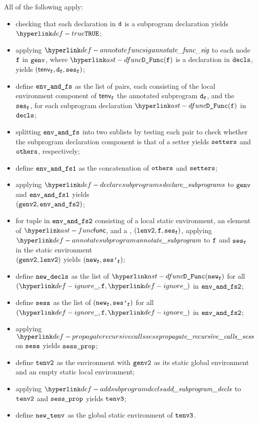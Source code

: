 \ProseParagraph
All of the following apply:
\begin{itemize}
  \item checking that each declaration in $\texttt{d}$ is a subprogram declaration yields $\True$\ProseTerminateAs{\BadDeclaration};
  \item applying $\annotatefuncsig$ to each node $\texttt{f}$ in $\texttt{genv}$, where $\DFunc(\vf)$ is a declaration in $\texttt{decls}$,
        yields $(\textsf{tenv}_{\texttt{f}}, \texttt{d}_{\texttt{f}}, \texttt{ses}_{\texttt{f}})$\ProseOrTypeError;
  \item define $\texttt{env\_and\_fs}$ as the list of pairs, each consisting of the local environment component of $\textsf{tenv}_{\texttt{f}}$
        the annotated subprogram $\texttt{d}_{\texttt{f}}$, and the \sideeffectsetterm\ $\texttt{ses}_{\texttt{f}}$, for each subprogram declaration $\DFunc(\vf)$ in $\texttt{decls}$;
  \item splitting $\texttt{env\_and\_fs}$ into two sublists by testing each pair to check whether the subprogram declaration
        component is that of a setter yields $\texttt{setters}$ and $\texttt{others}$, respectively;
  \item define $\texttt{env\_and\_fs1}$ as the concatenation of $\texttt{others}$ and $\texttt{setters}$;
  \item applying $\declaresubprograms$ to $\texttt{genv}$ and $\texttt{env\_and\_fs1}$ yields \\
        $(\texttt{genv2}, \texttt{env\_and\_fs2})$\ProseOrTypeError;
  \item for tuple in $\texttt{env\_and\_fs2}$ consisting of a local static environment, an element of $\func$,
        and a \sideeffectsetterm, $(\texttt{lenv2}, \texttt{f}, \texttt{ses}_{\texttt{f}})$,
        applying $\annotatesubprogram$ to $\texttt{f}$ and $\texttt{ses}_{\texttt{f}}$ in the static environment \\
        $(\texttt{genv2}, \texttt{lenv2})$ yields $(\texttt{new}_{\texttt{f}}, \texttt{ses'}_{\texttt{f}})$\ProseOrTypeError;
  \item define $\texttt{new\_decls}$ as the list of $\DFunc(\vnew_\vf)$ for all $(\Ignore, \vf, \Ignore)$ in $\texttt{env\_and\_fs2}$;
  \item define $\texttt{sess}$ as the list of $(\texttt{new}_{\texttt{f}}, \texttt{ses'}_{\texttt{f}})$ for all $(\Ignore, \vf, \Ignore)$ in $\texttt{env\_and\_fs2}$;
  \item applying $\propagaterecursivecallssess$ on $\texttt{sess}$ yields $\texttt{sess\_prop}$;
  \item define $\texttt{tenv2}$ as the environment with $\texttt{genv2}$ as its static global environment
        and an empty static local environment;
  \item applying $\addsubprogramdecls$ to $\texttt{tenv2}$ and $\texttt{sess\_prop}$ yields $\texttt{tenv3}$;
  \item define $\texttt{new\_tenv}$ as the global static environment of $\texttt{tenv3}$.
\end{itemize}

